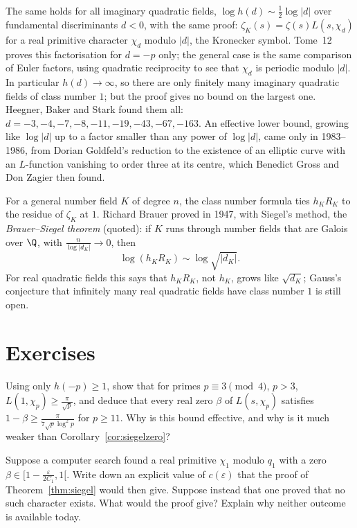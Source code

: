 The same holds for all imaginary quadratic fields, $\log h(d)\sim\frac12\log|d|$ over fundamental discriminants $d<0$, with the same proof: $\zeta_K(s)=\zeta(s)L(s,\chi_d)$ for a real primitive character $\chi_d$ modulo $|d|$, the Kronecker symbol. Tome~12 proves this factorisation for $d=-p$ only; the general case is the same comparison
of Euler factors, using quadratic reciprocity to see that $\chi_d$ is periodic modulo $|d|$. In particular $h(d)\to\infty$, so there are only finitely many imaginary quadratic fields of class number $1$; but the proof gives no bound on the largest one. Heegner, Baker and Stark found them all: $d=-3,-4,-7,-8,-11,-19,-43,-67,-163$. An effective lower
bound, growing like $\log|d|$ up to a factor smaller than any power of $\log|d|$, came only in 1983--1986, from Dorian Goldfeld's reduction to the existence of an elliptic curve with an $L$-function vanishing to order three at its centre, which Benedict Gross and Don Zagier then found.

For a general number field $K$ of degree $n$, the class number formula ties $h_KR_K$ to the residue of $\zeta_K$ at $1$. Richard Brauer proved in 1947, with Siegel's method, the \emph{Brauer--Siegel theorem} (quoted): if $K$ runs through number fields that are Galois over $\Q$, with $\frac n{\log|d_K|}\to0$, then
\[
\log(h_KR_K)\sim\log\sqrt{|d_K|}.
\]
For real quadratic fields this says that $h_KR_K$, not $h_K$, grows like $\sqrt{d_K}$; Gauss's conjecture that infinitely many real quadratic fields have class number $1$ is still open.

\section{Exercises}

\begin{exercise}[$\star$]\label{ex:hge1}
Using only $h(-p)\ge1$, show that for primes $p\equiv3\pmod4$, $p>3$, $L(1,\chi_p)\ge\frac\pi{\sqrt p}$, and deduce that every real zero $\beta$ of $L(s,\chi_p)$ satisfies $1-\beta\ge\frac\pi{7\sqrt p\log^2p}$ for $p\ge11$. Why is this bound effective, and why is it much weaker than Corollary~\ref{cor:siegelzero}?
\end{exercise}

\begin{exercise}[$\star$]\label{ex:ineffective}
Suppose a computer search found a real primitive $\chi_1$ modulo $q_1$ with a zero $\beta\in\bigl[1-\frac\varepsilon{2C_1},1\bigr[$. Write down an explicit value of $c(\varepsilon)$ that the proof of Theorem~\ref{thm:siegel} would then give. Suppose instead that one proved that no such character exists. What would the proof give? Explain why neither outcome is available today.
\end{exercise}

